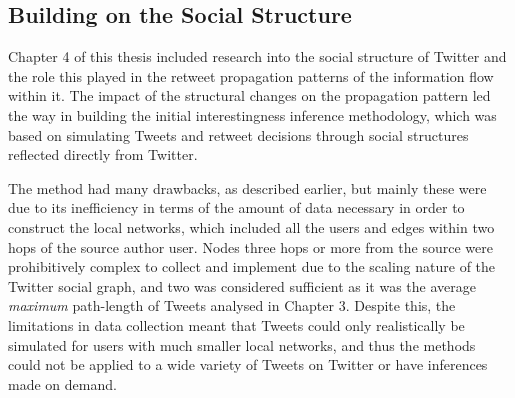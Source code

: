 


\subsection{Building on the Social Structure}
Chapter 4 of this thesis included research into the social structure of Twitter and the role this played in the retweet propagation patterns of the information flow within it. The impact of the structural changes on the propagation pattern led the way in building the initial interestingness inference methodology, which was based on simulating Tweets and retweet decisions through social structures reflected directly from Twitter.

The method had many drawbacks, as described earlier, but mainly these were due to its inefficiency in terms of the amount of data necessary in order to construct the local networks, which included all the users and edges within two hops of the source author user. Nodes three hops or more from the source were prohibitively complex to collect and implement due to the scaling nature of the Twitter social graph, and two was considered sufficient as it was the average \textit{maximum} path-length of Tweets analysed in Chapter 3. Despite this, the limitations in data collection meant that Tweets could only realistically be simulated for users with much smaller local networks, and thus the methods could not be applied to a wide variety of Tweets on Twitter or have inferences made on demand.

